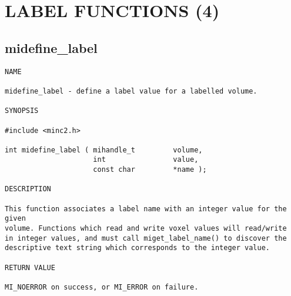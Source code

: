 \documentclass{article}
\begin{document}
                









\section{LABEL FUNCTIONS (4)}
\subsection{midefine\_label}
\begin{verbatim}
NAME

midefine_label - define a label value for a labelled volume.

SYNOPSIS

#include <minc2.h>

int midefine_label ( mihandle_t         volume, 
                     int                value, 
                     const char         *name );

DESCRIPTION

This function associates a label name with an integer value for the given
volume. Functions which read and write voxel values will read/write 
in integer values, and must call miget_label_name() to discover the 
descriptive text string which corresponds to the integer value.

RETURN VALUE

MI_NOERROR on success, or MI_ERROR on failure.
\end{verbatim}
\end{document}
